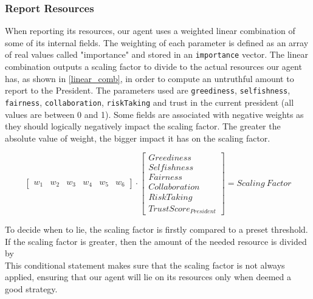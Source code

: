 \subsubsection{Report Resources} \label{reportresources}
When reporting its resources, our agent uses a weighted linear combination of some of its internal fields. The weighting of each parameter is defined as an array of real values called "importance" and stored in an \texttt{importance} vector. The linear combination outputs a scaling factor to divide to the actual resources our agent has, as shown in \eqref{linear_comb}, in order to compute an untruthful amount to report to the President. The parameters used are \texttt{greediness}, \texttt{selfishness}, \texttt{fairness}, \texttt{collaboration}, \texttt{riskTaking} and trust in the current president (all values are between 0 and 1). Some fields are associated with negative weights as they should logically negatively impact the scaling factor. The greater the absolute value of weight, the bigger impact it has on the scaling factor.

\begin{equation}\label{linear_comb}
    \begin{bmatrix}
        w_{1}& w_{2}& w_{3}& w_{4}& w_{5}& w_{6}
    \end{bmatrix}
    \cdot
    \begin{bmatrix}
    Greediness \\ 
    Selfishness \\ 
    Fairness \\ 
    Collaboration \\ 
    RiskTaking \\
    TrustScore_{President}
    \end{bmatrix}
    = Scaling\:Factor
\end{equation}

To decide when to lie, the scaling factor is firstly compared to a preset threshold. If the scaling factor is greater, then the amount of the needed resource is divided by 
\begin{equation}
    [1 + (Scaling\:Factor - Preset\:Threshold)]
\end{equation} 
This conditional statement makes sure that the scaling factor is not always applied, ensuring that our agent will lie on its resources only when deemed a good strategy.

